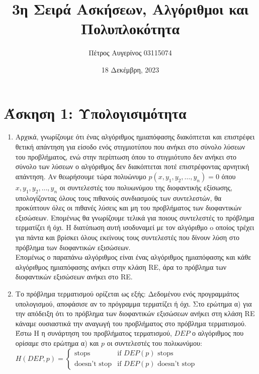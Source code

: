 \documentclass{article}
\title{3η Σειρά Ασκήσεων, Αλγόριθμοι και Πολυπλοκότητα}
\author{Πέτρος Αυγερίνος 03115074}
\date{18 Δεκέμβρη, 2023}
\begin{document}
\maketitle
\tableofcontents
\pagebreak

\section{Άσκηση 1: Υπολογισιμότητα}
\begin{enumerate}
    \item{}
Αρχικά, γνωρίζουμε ότι ένας αλγόριθμος ημιαπόφασης διακόπτεται και επιστρέφει θετική απάντηση για
είσοδο ενός στιγμιοτύπου που ανήκει στο σύνολο λύσεων του προβλήματος, ενώ στην περίπτωση όπου το
στιγμιότυπο δεν ανήκει στο σύνολο των λύσεων ο αλγόριθμος δεν διακόπτεται ποτέ επιστρέφοντας αρνητική
απάντηση. Αν θεωρήσουμε τώρα πολυώνυμο $p(x,y_1,y_2,\dots,y_n) = 0$ όπου $x,y_1,y_2,\dots,y_n$
οι συντελεστές του πολυωνύμου της διοφαντικής εξίσωσης, υπολογίζοντας όλους τους πιθανούς συνδιασμούς
των συντελεστών, θα προκύπτουν όλες οι πιθανές λύσεις και μη του προβλήματος των διοφαντικών εξισώσεων.
Επομένως θα γνωρίζουμε τελικά για ποιους συντελεστές το πρόβλημα τερματίζει ή όχι. Η διατύπωση αυτή 
ισοδυναμεί με τον αλγόριθμο o οποίος τρέχει για πάντα και βρίσκει όλους εκείνους τους συντελεστές που δίνουν
λύση στο πρόβλημα των διοφαντικών εξισώσεων.\cite{mrdp}\\

Επομένως ο παραπάνω αλγόριθμος είναι ένας αλγόριθμος ημιαπόφασης και κάθε αλγόριθμος ημιαπόφασης
ανήκει στην κλάση RE, άρα το πρόβλημα των διοφαντικών εξισώσεων ανήκει στο RE.\\

    \item{}
Το πρόβλημα τερματισμού ορίζεται ως εξής: Δεδομένου ενός προγραμμάτος υπολογισμού, αποφάσισε αν το πρόγραμμα
τερματίζει ή όχι. Στο ερώτημα α) για την απόδειξη ότι το πρόβλημα των διοφαντικών εξισώσεων ανήκει στη 
κλάση RE κάναμε ουσιαστικά την αναγωγή του προβλήματος στο πρόβλημα τερματισμού.\\

Έστω H η συνάρτηση του προβλήματος τερματισμού, $DEP$ ο αλγόριθμος που ορίσαμε στο ερώτημα α) και $p$ οι 
συντελεστές του πολυωνύμου:\\\break
$H(DEP,p) = 
\begin{cases}
    \text{stops} &\text{if $DEP(p)$ stops}\\
    \text{doesn't stop} &\text{if $DEP(p)$ doesn't stop}
\end{cases}$\\\break


\end{enumerate}
\end{document}
